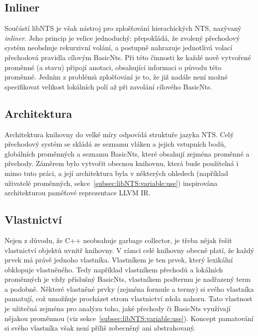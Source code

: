 \documentclass[12pt]{fithesis2}
\begin{document}
\subsection{Inliner}
Součástí libNTS je však nástroj pro zplošťování hierachických NTS, nazývaný \textit{inliner}. Jeho princip je velice jednoduchý: přepokládá, že zvolený přechodový systém neobshuje rekurzivní volání, a postupně nahrazuje jednotlivá volací přechodová pravidla cílovým BasicNts. Při této činnosti ke každé nově vytvořené proměnné (a stavu) připojí anotaci, obsahující informaci o původu této proměnné. Jedním z problémů zplošťování je to, že již nadále není možné specifikovat velikost lokálních polí až při zavolání cílového BasicNts.

\subsection{Architektura}
Architektura knihovny do velké míry odpovídá struktuře jazyka NTS. Celý přechodový systém se skládá ze seznamu vláken a jejich vstupních bodů, globálních proměnných a seznamu BasicNts, které obsahují zejména proměnné a přechody. Záměrem bylo vytvořit obecnou knihovnu, která bude použitelná i mimo tuto práci, a její architektura byla v některých ohledech (například uživatelé proměnných, sekce~\ref{subsec:libNTS:variable:use}) inspirována architekturou paměťové reprezentace LLVM IR.

\subsection{Vlastnictví}
\label{subsec:libNTS:ownership}
Nejen z důvodu, že C++ neobsahuje garbage collector, je třeba nějak řešit vlastnictví objektů uvnitř knihovny. V rámci celé knihovny obecně platí, že každý prvek má právě jednoho vlastníka. Vlastníkem je ten prvek, který lexikální obklopuje vlastněného. Tedy například vlastníkem přechodů a lokálních proměnných je vždy příslušný BasicNts, vlastníkem podtermu je nadřazený term a podobně. Některé vlastněné prvky (zejména formule a termy) si svého vlastníka pamatují, což umožňuje procházet strom vlastnictví zdola nahoru. Tato vlastnost je užitečná zejména pro analýzu toho, jaké přechody či BasicNts využívají nějakou proměnnou (viz sekce~\ref{subsec:libNTS:variable:use}). Koncept pamatování si svého vlastníka však není příliš zobecněný ani abstrahovaný.

\end{document}
